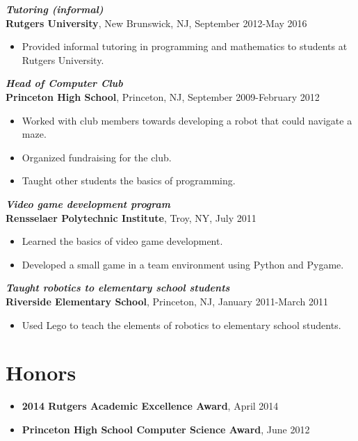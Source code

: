 \documentclass[12pt]{article}
\begin{document}
\textit{\textbf{Tutoring (informal)}} \\
\textbf{Rutgers University}, New Brunswick, NJ, September 2012-May 2016
\begin{itemize}
\item
Provided informal tutoring in programming and mathematics to students at Rutgers University.
\end{itemize}

\textit{\textbf{Head of Computer Club}} \\
\textbf{Princeton High School}, Princeton, NJ, September 2009-February 2012
\begin{itemize}
\item
Worked with club members towards developing a robot that could navigate a maze.
\item
Organized fundraising for the club.
\item
Taught other students the basics of programming.
\end{itemize}

\textit{\textbf{Video game development program}} \\
\textbf{Rensselaer Polytechnic Institute}, Troy, NY, July 2011
\begin{itemize}
\item
Learned the basics of video game development.
\item
Developed a small game in a team environment using Python and Pygame.
\end{itemize}

\textit{\textbf{Taught robotics to elementary school students}} \\
\textbf{Riverside Elementary School}, Princeton, NJ, January 2011-March 2011
\begin{itemize}
\item
Used Lego to teach the elements of robotics to elementary school students.
\end{itemize}

\fi

\section*{Honors}
\begin{itemize}
\item
\textbf{2014 Rutgers Academic Excellence Award}, April 2014
\item
\textbf{Princeton High School Computer Science Award}, June 2012
\end{itemize}
\end{document}
